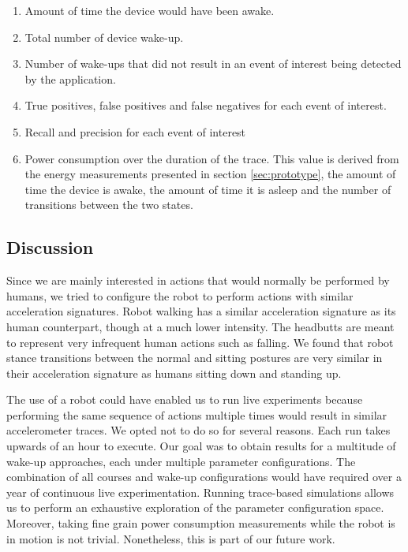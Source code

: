 \begin{enumerate}
\setlength{\itemsep}{-3pt}  

\item Amount of time the device would have been awake.

\item Total number of device wake-up.

\item Number of wake-ups that did not result in an event of interest
  being detected by the application.

\item True positives, false positives and false negatives for each event of interest.

\item Recall and precision for each event of interest

\item Power consumption over the duration of the trace.   This value is derived from the 
  energy measurements presented in section \ref{sec:prototype}, the
  amount of time the device is awake, the amount of time it is asleep
  and the number of transitions between the two states.

\end{enumerate}


\subsection{Discussion}

Since we are mainly interested in actions that would normally be
performed by humans, we tried to configure the robot to perform
actions with similar acceleration signatures.  Robot walking has a
similar acceleration signature as its human counterpart, though at a
much lower intensity.  The headbutts are meant to represent very
infrequent human actions such as falling. We found that robot stance
transitions between the normal and sitting postures are very similar
in their acceleration signature as humans sitting down and standing
up.


The use of a robot could have enabled us to run live experiments
because performing the same sequence of actions multiple times would
result in similar accelerometer traces. We opted not to do so for
several reasons. Each run takes upwards of an hour to execute. Our
goal was to obtain results for a multitude of wake-up approaches, each
under multiple parameter configurations. The combination of all
courses and wake-up configurations would have required over a year of
continuous live experimentation. Running trace-based simulations
allows us to perform an exhaustive exploration of the parameter
configuration space. Moreover, taking fine grain power consumption
measurements while the robot is in motion is not trivial.
Nonetheless, this is part of our future work.


